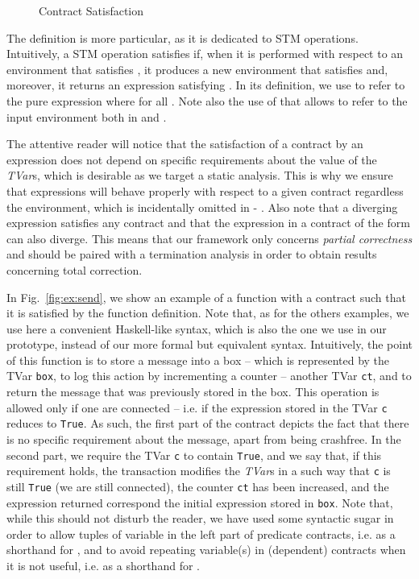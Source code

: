 \documentclass[submission,copyright,creativecommons]{eptcs}
\begin{document}
\begin{figure*}[htb]
  \centering
  \fbox{}
\caption{Contract Satisfaction}
  \label{fig:contractsemantics}
\end{figure*}

The definition  is more particular, as it is dedicated to STM operations. 
Intuitively, a STM operation  satisfies  if, when it is performed with respect to an environment that satisfies , it produces a new environment that satisfies  and, moreover, it returns an expression satisfying .
In its definition, we use  to refer to the pure expression  where  for all .
Note also the use of  that allows to refer to the input environment both in  and . 


The attentive reader will notice that the satisfaction of a contract by an expression does not depend on specific requirements about the value of the \emph{TVar}s, which is desirable as we target a static analysis. This is why we ensure that expressions will behave properly with respect to a given contract regardless the environment, which is incidentally omitted in  - . 
Also note that a diverging expression satisfies any contract and that the expression  in a contract of the form  can also diverge. This means that our framework only concerns \emph{partial correctness} and should be paired with a termination analysis \cite{binary-reachability-analysis,automated-termination-analysis} in order to obtain results concerning total correction.



In Fig.~\ref{fig:ex:send}, we show an example of a function with a contract such that it is satisfied by the function definition. 
Note that, as for the others examples, we use here a convenient Haskell-like syntax, which is also the one we use in our prototype, instead of our more formal but equivalent syntax.  
Intuitively, the point of this function is to store a message into a box -- which is represented by the TVar \texttt{box}, to log this action by incrementing a counter -- another TVar \texttt{ct}, and to return the message that was previously stored in the box. This operation is allowed only if one are connected -- i.e. if the expression stored in the TVar \texttt{c} reduces to \texttt{True}. As such, the first part of the contract depicts the fact that there is no specific requirement about the message, apart from being crashfree. In the second part, we require the TVar \texttt{c} to contain \texttt{True}, and we say that, if this requirement holds, the transaction modifies the \emph{TVar}s in a such way that \texttt{c} is still \texttt{True} (we are still connected), the counter \texttt{ct} has been increased, and the expression returned correspond the initial expression stored in \texttt{box}. Note that, while this should not disturb the reader, we have used some syntactic sugar in order to allow tuples of variable in the left part of predicate contracts, i.e.  as a shorthand for , and to avoid repeating variable(s) in (dependent) contracts when it is not useful, i.e.  as a shorthand for . 
\end{document}
